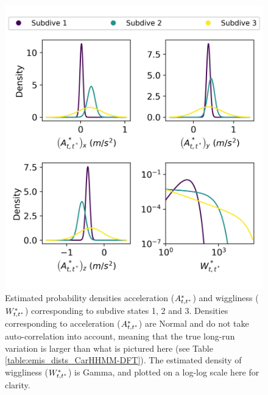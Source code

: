 \begin{figure}[ht]
	\centering
	\includegraphics[width=5in]{../Plots/CarHHMM2-fine-emissions.png}
	\caption{Estimated probability densities acceleration ($A^*_{t,t^*}$) and wiggliness ($W^*_{t,t^*}$) corresponding to subdive states 1, 2 and 3. Densities corresponding to acceleration ($A^*_{t,t^*}$) are Normal and do not take auto-correlation into account, meaning that the true long-run variation is larger than what is pictured here (see Table \ref{table:emis_dists_CarHHMM-DFT}). The estimated density of wiggliness ($W^*_{t,t^*}$) is Gamma, and plotted on a log-log scale here for clarity.}
	\label{fig:fine_emis}
\end{figure}

